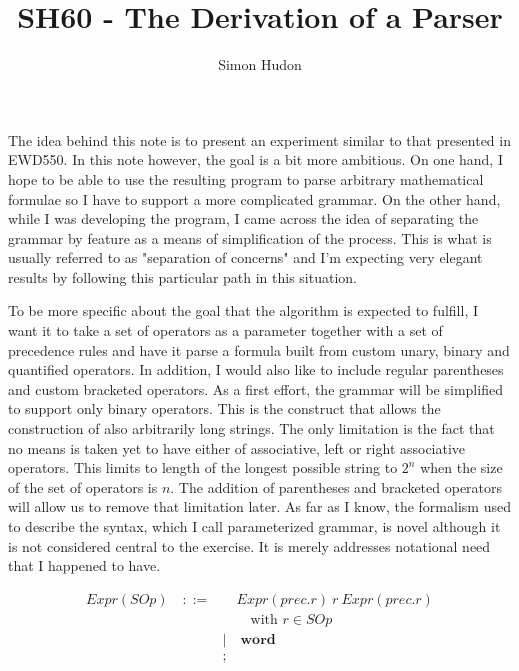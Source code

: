 \documentclass[10pt]{report}
\title{SH60 - The Derivation of a Parser}
\author{Simon Hudon}
\begin{document}
\maketitle

The idea behind this note is to present an experiment similar to that presented in EWD550.  In this note however, the goal is a bit more ambitious.  On one hand, I hope to be able to use the resulting program to parse arbitrary mathematical formulae so I have to support a more complicated grammar.  On the other hand, while I was developing the program, I came across the idea of separating the grammar by feature as a means of simplification of the process.  This is what is usually referred to as "separation of concerns" and I'm expecting very elegant results by following this particular path in this situation.

To be more specific about the goal that the algorithm is expected to fulfill, I want it to take a set of operators as a parameter together with a set of precedence rules and have it parse a formula built from custom unary, binary and quantified operators.  In addition, I would also like to include regular parentheses and custom bracketed operators.  As a first effort, the grammar will be simplified to support only binary operators.  This is the construct that allows the construction of also arbitrarily long strings.  The only limitation is the fact that no means is taken yet to have either of associative, left or right associative operators.  This limits to length of the longest possible string to $2^n$ when the size of the set of operators is $n$.  The addition of parentheses and bracketed operators will allow us to remove that limitation later.  As far as I know, the formalism used to describe the syntax, which I call parameterized grammar, is novel although it is not considered central to the exercise.  It is merely addresses notational need that I happened to have.

\begin{align}
	Expr(SOp) \quad ::= & \quad Expr (prec.r) \ r \ Expr (prec.r) \label{csyntax} \\
		& \qquad \text{with $r \in SOp$} \nonumber \\ 
		& | \quad \textbf{word} \nonumber \\
		& \nonumber ;
\end{align}
\end{document}
